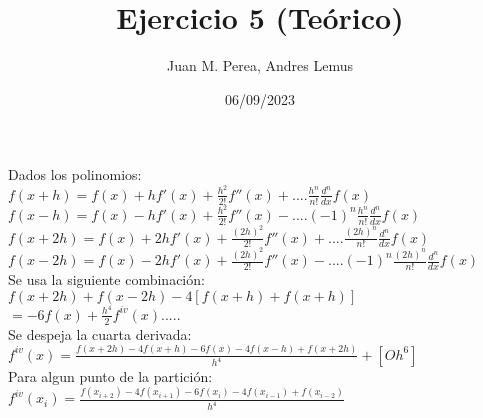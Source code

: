 \documentclass{article}
\title{Ejercicio 5 (Teórico)}
\author{Juan M. Perea, Andres Lemus}
\date{06/09/2023}
\begin{document}
\maketitle


Dados los polinomios:\\
		$f(x+h)=f(x)+hf'(x)+\frac{h^2}{2!}f''(x)+....\frac{h^n}{n!}\frac{d^n}{dx}f(x)$\\
		$f(x-h)=f(x)-hf'(x)+\frac{h^2}{2!}f''(x)-....(-1)^n\frac{h^n}{n!}\frac{d^n}{dx}f(x)$\\
		$f(x+2h)=f(x)+2hf'(x)+\frac{(2h)^2}{2!}f''(x)+....\frac{(2h)^n}{n!}\frac{d^n}{dx}f(x)$\\
		$f(x-2h)=f(x)-2hf'(x)+\frac{(2h)^2}{2!}f''(x)-....(-1)^n\frac{(2h)^n}{n!}\frac{d^n}{dx}f(x)$\\
		Se usa la siguiente combinación:\\
		$f(x+2h)+f(x-2h)-4[f(x+h)+f(x+h)]$\\
		$=-6f(x)+\frac{h^4}{2}f^{iv}(x).....$\\
		Se despeja la cuarta derivada:\\
		$f^{iv}(x)=\frac{f(x+2h)-4f(x+h)-6f(x)-4f(x-h)+f(x+2h)}{h^4}+[Oh^6]$\\
		Para algun punto de la partición:\\
		$f^{iv}(x_i)=\frac{f(x_{i+2})-4f(x_{i+1})-6f(x_i)-4f(x_{i-1})+f(x_{i-2})}{h^4}$
\end{document}
